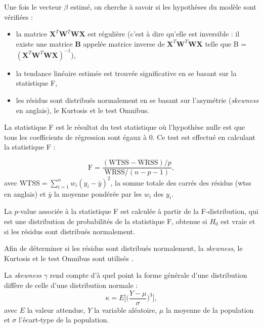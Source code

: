 Une fois le vecteur $\beta$ estimé, on cherche à savoir si les hypothèses du modèle sont vérifiées : 
\begin{itemize}
    \item la matrice ${\textbf{X}}^{T}\textbf{W}^{T}\textbf{WX}$ est régulière (c'est à dire qu'elle est inversible : il existe une matrice \textbf{B} appelée matrice inverse de 
		${\textbf{X}}^{T}\textbf{W}^{T}\textbf{WX}$ telle que B = $({\textbf{X}}^{T}\textbf{W}^{T}\textbf{WX})^{-1}$),
    \item la tendance linéaire estimée est trouvée significative en se basant sur la statistique F,
    \item les résidus sont distribués normalement en se basant sur l'asymétrie (\textit{skewness} en anglais), le Kurtosis et le test Omnibus.
\end{itemize} 

La statistique F est le résultat du test statistique où l'hypothèse nulle est que tous les coefficients de régression sont égaux à 0. Ce test est effectué en calculant 
la statistique F \citep{James2013} :

\begin{equation}
\label{eq:factors_statistic_F}
\text{F} = \frac{ (\text{WTSS} - \text{WRSS}) / p }{ \text{WRSS} /(n - p - 1) }, 
\end{equation}
avec $\text{WTSS} = \sum_{i=1}^{n} w_i(y_i - \bar{y})^2$, la somme totale des carrés des résidus (\gls{wtss} en anglais) et $\bar{y}$ la moyenne 
pondérée par les $w_i$ des $y_i$. 

La $p$-value associée à la statistique F est calculée à partir de la F-distribution, qui est une distribution de probabilités de la statistique F, obtenue si $H_{0}$ 
est vraie et si les résidus sont distribués normalement.

Afin de déterminer si les résidus sont distribués normalement, la \textit{skewness}, le Kurtosis et le test Omnibus sont utilisés \citep{dagostino1973, dagostino1971, Bowman1975}.

La \textit{skewness} $\gamma$ rend compte d'à quel point la forme générale d'une distribution diffère de celle d'une distribution normale : 
\begin{equation}
\label{eq:factors_skewness}
\kappa = E \Big[ \Big(\frac{ Y - \mu }{ \sigma }\Big)^{3} \Big], 
\end{equation}
avec $E$ la valeur attendue, $Y$ la variable aléatoire, $\mu$ la moyenne de la population et $\sigma$ l'écart-type de la population.

